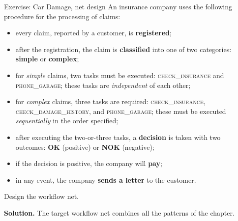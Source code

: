 \begin{examplebox}{Exercise: Car Damage, net design}
An insurance company uses the following procedure for the processing of claims:

\begin{itemize}
  \item every claim, reported by a customer, is \textbf{registered};
  \item after the registration, the claim is \textbf{classified} into one of two categories: \textbf{simple} or \textbf{complex};
  \item for \emph{simple} claims, two tasks must be executed: \textsc{check\_insurance} and \textsc{phone\_garage}; these tasks are \emph{independent} of each other;
  \item for \emph{complex} claims, three tasks are required: \textsc{check\_insurance}, \textsc{check\_damage\_history}, and \textsc{phone\_garage}; these must be executed \emph{sequentially} in the order specified;
  \item after executing the two-or-three tasks, a \textbf{decision} is taken with two outcomes: \textbf{OK} (positive) or \textbf{NOK} (negative);
  \item if the decision is positive, the company will \textbf{pay};
  \item in any event, the company \textbf{sends a letter} to the customer.
\end{itemize}

Design the workflow net.

\medskip
\textbf{Solution.} The target workflow net combines all the patterns of the chapter.


\end{examplebox}
